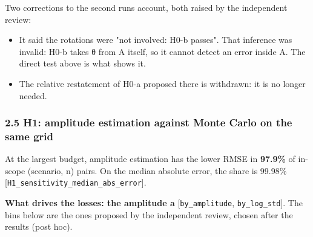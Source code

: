 \documentclass[
  10pt,
]{article}
\providecommand{\tightlist}{%
  \setlength{\itemsep}{0pt}\setlength{\parskip}{0pt}}
\begin{document}
Two corrections to the second run\textquotesingle s account, both raised
by the independent review:

\begin{itemize}
\tightlist
\item
  It said the rotations were "not involved: H0-b passes". That inference
  was invalid: H0-b takes θ from A itself, so it cannot detect an error
  inside A. The direct test above is what shows it.
\item
  The relative restatement of H0-a proposed there is withdrawn: it is no
  longer needed.
\end{itemize}

\hypertarget{25-h1-amplitude-estimation-against-monte-carlo-on-the-same-grid}{%
\subsubsection{2.5 H1: amplitude estimation against Monte Carlo on the
same
grid}\label{25-h1-amplitude-estimation-against-monte-carlo-on-the-same-grid}}

At the largest budget, amplitude estimation has the lower RMSE in
\textbf{97.9\%} of in-scope (scenario, n) pairs. On the median absolute
error, the share is 99.98\%
{[}\texttt{H1\_sensitivity\_median\_abs\_error}{]}.

\textbf{What drives the losses: the amplitude a}
{[}\texttt{by\_amplitude}, \texttt{by\_log\_std}{]}. The bins below are
the ones proposed by the independent review, chosen after the results
(post hoc).
\end{document}
